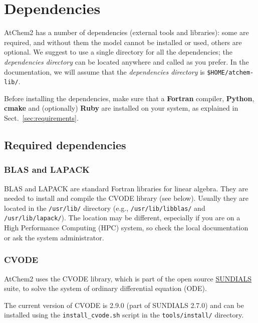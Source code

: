 \section{Dependencies} \label{sec:dependencies}

AtChem2 has a number of dependencies (external tools and libraries):
some are required, and without them the model cannot be installed or
used, others are optional. We suggest to use a single directory for
all the dependencies; the \emph{dependencies directory} can be located
anywhere and called as you prefer. In the documentation, we will
assume that the \emph{dependencies directory} is
\texttt{\$HOME/atchem-lib/}.

Before installing the dependencies, make sure that a \textbf{Fortran}
compiler, \textbf{Python}, \textbf{cmake} and (optionally)
\textbf{Ruby} are installed on your system, as explained in
Sect.~\ref{sec:requirements}.

\subsection{Required dependencies} \label{subsec:required-dependencies}

\subsubsection{BLAS and LAPACK}

BLAS and LAPACK are standard Fortran libraries for linear
algebra. They are needed to install and compile the CVODE library (see
below). Usually they are located in the \texttt{/usr/lib/} directory
(e.g., \texttt{/usr/lib/libblas/} and \texttt{/usr/lib/lapack/}). The
location may be different, especially if you are on a High Performance
Computing (HPC) system, so check the local documentation or ask the
system administrator.

\subsubsection{CVODE}

AtChem2 uses the CVODE library, which is part of the open source
\href{https://computation.llnl.gov/projects/sundials}{SUNDIALS} suite,
to solve the system of ordinary differential equation (ODE).

The current version of CVODE is 2.9.0 (part of SUNDIALS 2.7.0) and can
be installed using the \texttt{install\_cvode.sh} script in the
\texttt{tools/install/} directory.

